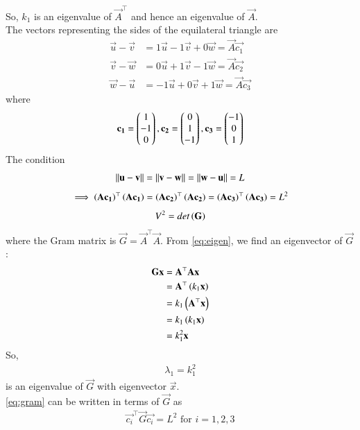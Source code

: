 \documentclass[journal]{IEEEtran}
\begin{document}
So, $k_1$ is an eigenvalue of $\vec{A}^\top$ and hence an eigenvalue of $\vec{A}$. \\
The vectors representing the sides of the equilateral triangle are
\begin{align}
    \vec{u} - \vec{v} &= 1\vec{u}-1\vec{v}+0\vec{w} = \vec{A}\vec{c_1} \label{eq:1} \\
    \vec{v} - \vec{w} &= 0\vec{u}+1\vec{v}-1\vec{w} = \vec{A}\vec{c_2} \label{eq:2} \\
    \vec{w} - \vec{u} &= -1\vec{u}+0\vec{v}+1\vec{w} = \vec{A}\vec{c_3} \label{eq:3}
\end{align}
where 
\begin{align}
	\mathbf{c_1} = \begin{pmatrix}1 \\ -1 \\ 0\end{pmatrix}, \mathbf{c_2} = \begin{pmatrix}0 \\ 1 \\ -1\end{pmatrix}, \mathbf{c_3} = \begin{pmatrix}-1 \\ 0 \\ 1\end{pmatrix}
\end{align}
The condition 
\begin{align}
	\left\lVert\mathbf{u} - \mathbf{v}\right\rVert = \left\lVert\mathbf{v} - \mathbf{w}\right\rVert = \left\lVert\mathbf{w} - \mathbf{u}\right\rVert = L
\end{align}
\begin{align}
    \implies \left(\mathbf{A}\mathbf{c_1}\right)^\top\left(\mathbf{A}\mathbf{c_1}\right) = \left(\mathbf{A}\mathbf{c_2}\right)^\top\left(\mathbf{A}\mathbf{c_2}\right) = \left(\mathbf{A}\mathbf{c_3}\right)^\top\left(\mathbf{A}\mathbf{c_3}\right) = L^2 \label{eq:gram}
\end{align}
\begin{align}
    V^2 = det\left(\mathbf{G}\right) 
\end{align}
where the Gram matrix is $\vec{G} = \vec{A}^\top\vec{A}$. From \eqref{eq:eigen}, we find an eigenvector of $\vec{G}$:
\begin{align}
    \mathbf{G}\mathbf{x} &= \mathbf{A}^\top\mathbf{A}\mathbf{x} \\
    &= \mathbf{A}^\top\left(k_1\mathbf{x}\right) \\
    &= k_1\left(\mathbf{A}^\top\mathbf{x}\right) \\
    &= k_1\left(k_1\mathbf{x}\right) \\
    &= k_1^2\mathbf{x}
\end{align}
So, 
\begin{align}
	\lambda_1 = k_1^2
\end{align} is an eigenvalue of $\vec{G}$ with eigenvector $\vec{x}$. \\
\eqref{eq:gram} can be written in terms of $\vec{G}$ as
\begin{align}
    \vec{c_i}^\top \vec{G} \vec{c_i} = L^2 \text{ for } i=1,2,3 \label{eq:list}
\end{align}
\end{document}
